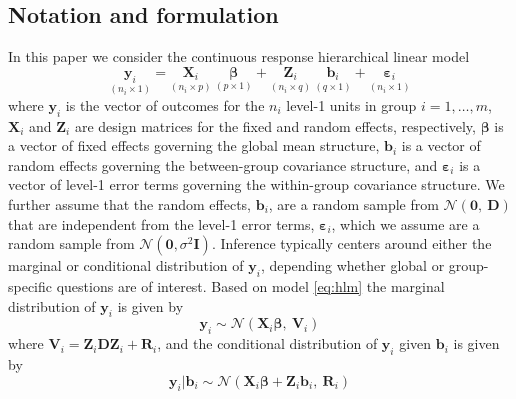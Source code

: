 \documentclass{article} %
\begin{document}
\subsection{Notation and formulation}
In this paper we consider the continuous response hierarchical linear model
%
\begin{equation}\label{eq:hlm}
	\underset{(n_i \times 1)}{\bm{y}_i} = \underset{(n_i \times p)}{\bm{X}_i} \ \underset{(p \times 1)}{\bm{\beta}} + \underset{(n_i \times q)}{\bm{Z}_i} \ \underset{(q \times 1)}{\bm{b}_i} + \underset{(n_i \times 1)}{\bm{\varepsilon}_i}
\end{equation}
%
where $\bm{y}_i$ is the vector of outcomes for the $n_i$ level-1 units in group $i=1, \ldots, m$, $\bm{X}_i$ and $\bm{Z}_i$ are design matrices for the fixed and random effects, respectively, $\bm{\beta}$ is a vector of fixed effects governing the global mean structure, $\bm{b}_i$ is a vector of random effects governing the between-group covariance structure, and $\bm{\varepsilon}_i$ is a vector of level-1 error terms governing the within-group covariance structure. We further assume that the random effects, $\bm{b}_i$, are a random sample from $\mathcal{N}(\bm{0},\ \bm{D})$ that are independent from the level-1 error terms, $\bm{\varepsilon}_i$, which we assume are a random sample from $\mathcal{N}(\bm{0},\sigma^2 \bm{I})$. %
Inference typically centers around either the marginal or conditional distribution of $\bm{y}_i$, depending whether global or group-specific questions are of interest.
Based on model \eqref{eq:hlm} the marginal distribution of $\bm{y}_i$ is given by
%
\begin{equation}\label{eq:marginalmod}
\bm{y}_i \sim \mathcal{N}\left(\bm{X}_i\bm{\beta},\ \bm{V}_i \right)
\end{equation}
%
where $\bm{V}_i = \bm{Z}_i \bm{DZ}_i + \bm{R}_i$, and the conditional distribution of $\bm{y}_i$ given $\bm{b}_i$ is given by
%
\begin{equation}\label{eq:conditionalmod}
\bm{y}_i | \bm{b}_i \sim \mathcal{N}\left(\bm{X}_i\bm{\beta} + \bm{Z}_i \bm{b}_i, \ \bm{R}_i \right)
\end{equation}
%
\end{document}
